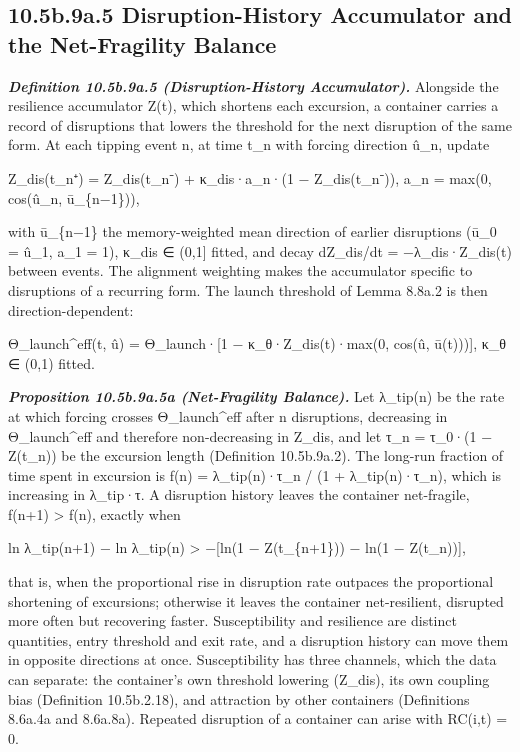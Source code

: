 \documentclass[
]{article}
\begin{document}
\hypertarget{b.9a.5-disruption-history-accumulator-and-the-net-fragility-balance}{%
\subsection{10.5b.9a.5 Disruption-History Accumulator and the
Net-Fragility
Balance}\label{b.9a.5-disruption-history-accumulator-and-the-net-fragility-balance}}

\emph{\textbf{Definition 10.5b.9a.5 (Disruption-History Accumulator).}}
Alongside the resilience accumulator Z(t), which shortens each
excursion, a container carries a record of disruptions that lowers the
threshold for the next disruption of the same form. At each tipping
event n, at time t\_n with forcing direction û\_n, update

Z\_dis(t\_n⁺) = Z\_dis(t\_n⁻) + κ\_dis·a\_n·(1 − Z\_dis(t\_n⁻)), a\_n =
max(0, cos(û\_n, ū\_\{n−1\})),

with ū\_\{n−1\} the memory-weighted mean direction of earlier
disruptions (ū\_0 = û\_1, a\_1 = 1), κ\_dis ∈ (0,1{]} fitted, and decay
dZ\_dis/dt = −λ\_dis·Z\_dis(t) between events. The alignment weighting
makes the accumulator specific to disruptions of a recurring form. The
launch threshold of Lemma 8.8a.2 is then direction-dependent:

Θ\_launch\^{}eff(t, û) = Θ\_launch·{[}1 − κ\_θ·Z\_dis(t)·max(0, cos(û,
ū(t))){]}, κ\_θ ∈ (0,1) fitted.

\emph{\textbf{Proposition 10.5b.9a.5a (Net-Fragility Balance).}} Let
λ\_tip(n) be the rate at which forcing crosses Θ\_launch\^{}eff after n
disruptions, decreasing in Θ\_launch\^{}eff and therefore non-decreasing
in Z\_dis, and let τ\_n = τ\_0·(1 − Z(t\_n)) be the excursion length
(Definition 10.5b.9a.2). The long-run fraction of time spent in
excursion is f(n) = λ\_tip(n)·τ\_n / (1 + λ\_tip(n)·τ\_n), which is
increasing in λ\_tip·τ. A disruption history leaves the container
net-fragile, f(n+1) \textgreater{} f(n), exactly when

ln λ\_tip(n+1) − ln λ\_tip(n) \textgreater{} −{[}ln(1 − Z(t\_\{n+1\})) −
ln(1 − Z(t\_n)){]},

that is, when the proportional rise in disruption rate outpaces the
proportional shortening of excursions; otherwise it leaves the container
net-resilient, disrupted more often but recovering faster.
Susceptibility and resilience are distinct quantities, entry threshold
and exit rate, and a disruption history can move them in opposite
directions at once. Susceptibility has three channels, which the data
can separate: the container's own threshold lowering (Z\_dis), its own
coupling bias (Definition 10.5b.2.18), and attraction by other
containers (Definitions 8.6a.4a and 8.6a.8a). Repeated disruption of a
container can arise with RC(i,t) = 0.
\end{document}
